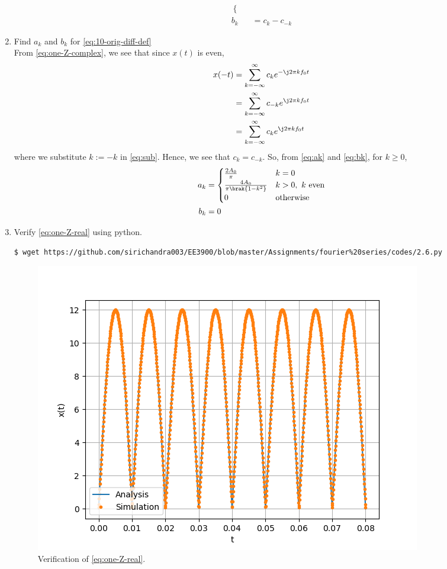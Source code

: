 \documentclass[journal,12pt,twocolumn]{IEEEtran}
\renewcommand\thesection{\arabic{section}}
\begin{document}
\begin{enumerate}[label=\thesection.\arabic*,ref=\thesection.\theenumi]
\begin{align}
\begin{cases}
\end{cases} \label{eq:ak} \\
b_k &= c_k - c_{-k}
\label{eq:bk}
\end{align}
\item Find $a_k$ and $b_k$ for
\eqref{eq:10-orig-diff-def} \\
\solution From \eqref{eq:one-Z-complex}, we see that since $x(t)$ is even,
\begin{align}
x(-t) &= \sum_{k = -\infty}^{\infty}c_ke^{-\j2\pi kf_0 t} \\
&= \sum_{k = -\infty}^{\infty}c_{-k}e^{\j2\pi kf_0t} \label{eq:sub} \\
&= \sum_{k = -\infty}^{\infty}c_ke^{\j2\pi kf_0 t}
\end{align}
where we substitute $k := -k$ in \eqref{eq:sub}. Hence, we see that
$c_k = c_{-k}$. So, from \eqref{eq:ak} and \eqref{eq:bk}, for $k \ge 0$,
\begin{align}
a_k &=
\begin{cases}
\frac{2A_0}{\pi} & k = 0 \\
\frac{4A_0}{\pi\brak{1 - k^2}} & k > 0,\ k\ \text{even} \\
0 & \text{otherwise}
\end{cases} \label{eq:ak-xt}\\
b_k &= 0
\label{eq:bk-xt}
\end{align}
\item Verify
\eqref{eq:one-Z-real}
using python. \\
\solution
\begin{lstlisting}
$ wget https://github.com/sirichandra003/EE3900/blob/master/Assignments/fourier%20series/codes/2.6.py
\end{lstlisting}
\begin{figure}[!ht]
\includegraphics[width=\columnwidth]{figs/2.6.png}
\caption{Verification of \eqref{eq:one-Z-real}.}
\label{fig:ver-real}
\end{figure}
\end{enumerate}
\end{document}
